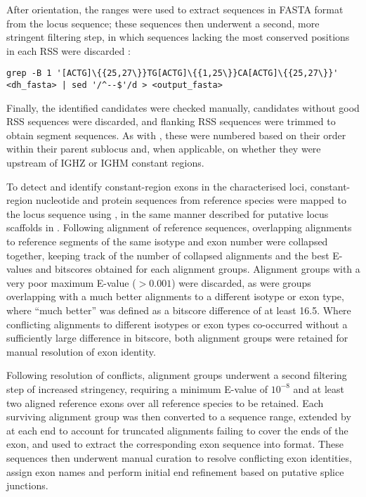 After orientation, the \dh ranges were used to extract \dh sequences in FASTA format from the locus sequence; these sequences then underwent a second, more stringent filtering step, in which sequences lacking the most conserved positions in each RSS were discarded \parencite{grep}:

\begin{lstlisting}
grep -B 1 '[ACTG]\{{25,27\}}TG[ACTG]\{{1,25\}}CA[ACTG]\{{25,27\}}' <dh_fasta> | sed '/^--$'/d > <output_fasta>
\end{lstlisting}

Finally, the identified \dh candidates were checked manually, candidates without good RSS sequences were discarded, and flanking RSS sequences were trimmed to obtain \dh segment sequences. As with \jh, these were numbered based on their order within their parent sublocus and, when applicable, on whether they were upstream of IGHZ or IGHM constant regions.


To detect and identify constant-region exons in the characterised loci, constant-region nucleotide and protein sequences from reference species were mapped to the locus sequence using  \parencite{altschul1990blast,altschul1997blast}, in the same manner described for putative locus scaffolds in .
Following alignment of reference sequences, overlapping alignments to reference segments of the same isotype and exon number were collapsed together, keeping track of the number of collapsed alignments and the best E-values and bitscores obtained for each alignment groups. Alignment groups with a very poor maximum E-value ($> 0.001$) were discarded, as were groups overlapping with a much better alignments to a different isotype or exon type, where ``much better'' was defined as a bitscore difference of at least 16.5. Where conflicting alignments to different isotypes or exon types co-occurred without a sufficiently large difference in bitscore, both alignment groups were retained for manual resolution of exon identity.

Following resolution of conflicts, alignment groups underwent a second filtering step of increased stringency, requiring a minimum E-value of $10^{-8}$ and at least two aligned reference exons over all reference species to be retained. Each surviving alignment group was then converted to a sequence range, extended by  at each end to account for truncated alignments failing to cover the ends of the exon, and used to extract the corresponding exon sequence into  format. These sequences then underwent manual curation to resolve conflicting exon identities, assign exon names and perform initial end refinement based on putative splice junctions.

